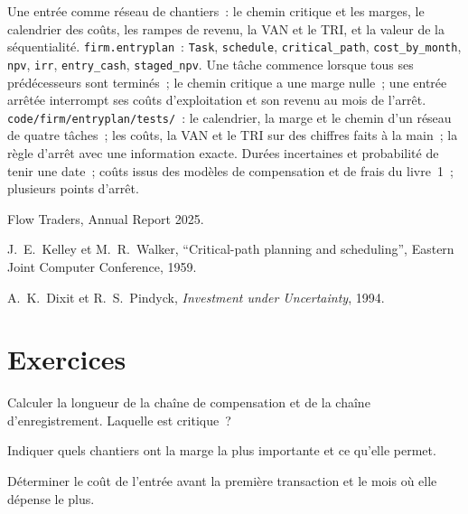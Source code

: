 \begin{build}
 Une entrée comme réseau de chantiers~: le chemin critique et les marges, le calendrier des coûts, les rampes de revenu, la VAN et le TRI, et la valeur de la
séquentialité.
 \texttt{firm.entryplan}~: \texttt{Task}, \texttt{schedule}, \texttt{critical\_path}, \texttt{cost\_by\_month}, \texttt{npv},
\texttt{irr}, \texttt{entry\_cash}, \texttt{staged\_npv}.
 Une tâche commence lorsque tous ses prédécesseurs sont terminés~; le chemin critique a une marge nulle~; une entrée arrêtée interrompt ses coûts d'exploitation et son revenu
au mois de l'arrêt.
 \texttt{code/firm/entryplan/tests/}~: le calendrier, la marge et le chemin d'un réseau de quatre tâches~; les coûts, la VAN et le TRI sur des chiffres faits à la main~;
la règle d'arrêt avec une information exacte.
 Durées incertaines et probabilité de tenir une date~; coûts issus des modèles de compensation et de frais du livre~1~; plusieurs points d'arrêt.
\end{build}

\begin{omsources}
\item Flow Traders, Annual Report 2025.
\item J.~E.~Kelley et M.~R.~Walker, ``Critical-path planning and scheduling'', Eastern Joint Computer Conference, 1959.
\item A.~K.~Dixit et R.~S.~Pindyck, \emph{Investment under Uncertainty}, 1994.
\end{omsources}

\section{Exercices}

\begin{exercise}[$\star$]\label{exo:fm:entering-a-new-market:1}
Calculer la longueur de la chaîne de compensation et de la chaîne d'enregistrement. Laquelle est critique~?
\end{exercise}

\begin{exercise}[$\star$]\label{exo:fm:entering-a-new-market:2}
Indiquer quels chantiers ont la marge la plus importante et ce qu'elle permet.
\end{exercise}

\begin{exercise}[$\star$]\label{exo:fm:entering-a-new-market:3}
Déterminer le coût de l'entrée avant la première transaction et le mois où elle dépense le plus.
\end{exercise}


